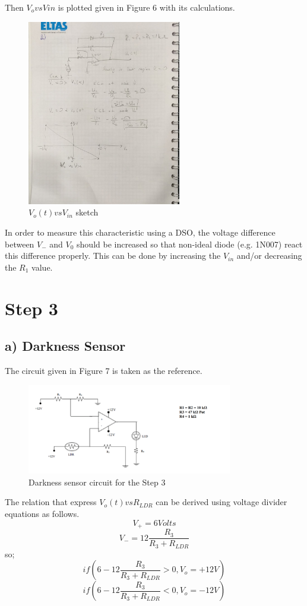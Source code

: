 \documentclass[letterpaper,12pt]{article}
\begin{document}
Then \(V_o vs V{in}\) is plotted given in Figure 6 with its calculations.
\begin{figure}[H]
	\centering
   \includegraphics[width=0.6\textwidth]{2_hand.jpeg}
   \caption{\(V_o(t) vs V_{in}\) sketch}
\end{figure} 
In order to measure this characteristic using a DSO, the voltage difference between \(V_-\) and \(V_0\) should be increased so  that non-ideal diode (e.g. 1N007) react this difference properly. This can be done by increasing the \(V_{in}\) and/or decreasing the \(R_1\) value.
\section{Step 3}
\subsection{a) Darkness Sensor}
The circuit given in Figure 7 is taken as the reference.
\begin{figure}[H]
	\centering
   \includegraphics[width=0.8\textwidth]{darkness.png}
   \caption{Darkness sensor circuit for the Step 3}
\end{figure} 
The relation that express \(V_o(t) vs R_{LDR}\) can be derived using voltage divider equations as follows.
\[V_+ = 6 Volts
\]\[
V_- = 12\frac{R_3}{R_3+R_{LDR}}
\]
so;
\[ 
if (6-12\frac{R_3}{R_3+R_{LDR}} > 0, V_o = +12V)
\]\[ 
if (6-12\frac{R_3}{R_3+R_{LDR}} < 0, V_o = -12V)
\]
\end{document}
